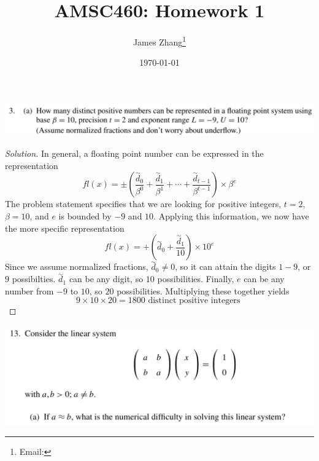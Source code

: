 \documentclass[12pt]{scrartcl}
\begin{document}
\title{AMSC460: Homework 1}
\author{James Zhang\thanks{Email: }}
\date{\today}



\maketitle

\includegraphics[width=14cm]{3a.png}

\begin{proof}[Solution]
  In general, a floating point number can be expressed in the representation 
  \[fl(x) = \pm \left( \frac{\overset{\sim}{d}_0}{\beta^0} + \frac{\overset{\sim}{d}_1}{\beta^1} + \cdots 
  + \frac{\overset{\sim}{d}_{t-1}}{\beta^{t-1}}\right) \times \beta^e\]
  The problem statement specifies that we are looking for positive integers, $t = 2$, $\beta = 10$, and 
  $e$ is bounded by $-9$ and $10$. Applying this information, we now have the more specific representation 
  \[fl(x) = + \left( \overset{\sim}{d}_0 + \frac{\overset{\sim}{d}_1}{10}\right) \times 10^e\]
  Since we assume normalized fractions, $\overset{\sim}{d}_0 \neq 0$, so it can attain the digits $1-9$, or $9$ possibilties. 
  $\overset{\sim}{d}_1$ can be any digit, so $10$ possibilities. Finally, $e$ can be any number from $-9$ to $10$, so $20$ possibilities. 
  Multiplying these together yields 
  \[9 \times 10 \times 20 = 1800 \text{ distinct positive integers }\]
\end{proof}

\newpage

\includegraphics[width=14cm]{13a.png}
\end{document}
